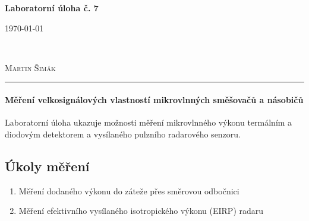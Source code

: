 \documentclass[11pt,a4paper]{article}
\begin{document}

\begin{center}
    {\LARGE\textbf{Laboratorní úloha č. 7}}\\[3mm]
    \begin{minipage}{0.4\textwidth}
        \begin{flushleft}
            \textsc{\today}
        \end{flushleft}
    \end{minipage}
    ~
    \begin{minipage}{0.4\textwidth}
        \begin{flushright}
            \textsc{Martin Šimák}
        \end{flushright}
    \end{minipage}
    \noindent\rule{14.5cm}{0.4pt}
\end{center}

\paragraph*{Měření velkosignálových vlastností mikrovlnných směšovačů a násobičů} Laboratorní úloha ukazuje možnosti měření mikrovlnného výkonu termálním a diodovým detektorem a vysílaného pulzního radarového senzoru.

\subsection*{Úkoly měření}
\begin{enumerate}
    \item Měření dodaného výkonu do záteže přes směrovou odbočnici
    \item Měření efektivního vysílaného isotropického výkonu (EIRP) radaru
\end{enumerate}
\end{document}
